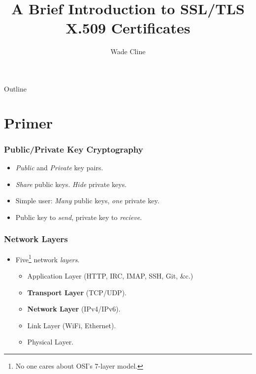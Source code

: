 \documentclass[xcolor={dvipsnames,svgnames},hyperref=dvips]{beamer}
\title[X.509 Introduction]{A Brief Introduction to SSL/TLS X.509 Certificates}
\author{Wade Cline}
\begin{document}
\begin{frame}
  \titlepage
\end{frame}

\begin{frame}{Outline}
  \tableofcontents
\end{frame}

\section{Primer}
	\begin{frame}
		\frametitle{Public/Private Key Cryptography}
		\begin{itemize}
		\item \textit{Public} and \textit{Private} key pairs.
		\item \textit{Share} public keys.  \textit{Hide} private keys.
		\item Simple user: \textit{Many} public keys, \textit{one} private key.
		\item Public key to \textit{send}, private key to \textit{recieve}.
		\end{itemize}
	\end{frame}

	\begin{frame}
		\frametitle{Network Layers}
		\begin{itemize}
		\item Five\footnote{No one cares about OSI's 7-layer model.} network \textit{layers}.
			\begin{itemize}
			\item Application Layer (HTTP, IRC, IMAP, SSH, Git, \&c.)
			\item \textbf{Transport Layer} (TCP/UDP).
			\item \textbf{Network Layer} (IPv4/IPv6).
			\item Link Layer (WiFi, Ethernet).
			\item Physical Layer.
			\end{itemize}
		\end{itemize}
	\end{frame}
\end{document}
